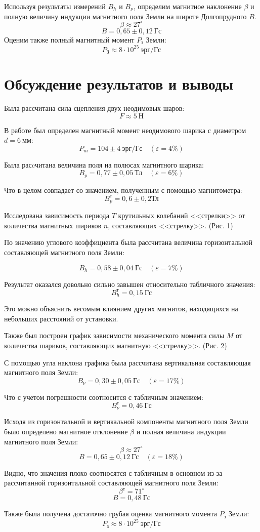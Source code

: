 Используя результаты измерений $B_h$ и $B_\nu$, определим магнитное наклонение $\beta$ и полную
величину индукции магнитного поля Земли на широте Долгопрудного $B$. 
     \[   \beta  \approx 27^\circ  \]
     \[   B = 0,65 \pm 0,12 \ \text{Гс}\]
Оценим также полный магнитный момент $P_\text{з}$ Земли:
\[ P_\text{З} \approx 8\cdot 10^{25}\ \text{эрг}/\text{Гс} \]

\section{Обсуждение результатов и выводы}
Была рассчитана сила сцепления двух неодимовых шаров:
\[ F \approx 5\ \text{Н}\]

В работе был определен магнитный момент неодимового шарика с диаметром $d = 6\ \text{мм}$:
\[P_m = 104 \pm 4\ \text{эрг}/\text{Гс}\quad (\varepsilon = 4\%)\]

Была расcчитана величина поля на полюсах магнитного шарика:
\[ B_p = 0,77 \pm 0,05\ \text{Тл} \quad (\varepsilon = 6\%) \]

Что в целом совпадает со значением, полученным с помощью магнитометра:
\[ B_p^\text{т} = 0,6 \pm 0,2 \text{Тл} \]

Исследована зависимость периода $T$ крутильных колебаний <<стрелки>> от количества магнитных
шариков $n$, составляющих <<стрелку>>. (Рис. 1)

По значению углового коэффициента была рассчитана величина горизонтальной составляющей
магнитного поля Земли:

\[ B_h = 0,58 \pm 0,04\ \text{Гс} \quad (\varepsilon= 7\%)\]

Результат оказался довольно сильно завышен относительно табличного значения:
\[ B_h^\text{т} = 0,15\ \text{Гс} \]

Это можно объяснить весомым влиянием других магнитов, находящихся на небольших расстояний от
установки.

Также был построен график зависимости механического момента силы $M$ от количества шариков,
составляющих магнитную <<стрелку>>. (Рис. 2)

С помощью угла наклона графика была рассчитана вертикальная составляющая магнитного поля
Земли: 
\[ B_\nu = 0,30 \pm 0,05\ \text{Гс} \quad (\varepsilon = 17\%)  \]

Что с учетом погрешности соотносится с табличным значением:
\[ B_\nu^\text{т} = 0,46 \ \text{Гс} \]

Исходя из горизонтальной и вертикальной компоненты магнитного поля Земли было определено
магнитное отклонение $\beta$ и полная величина индукции магнитного поля Земли:
\[ \beta \approx 27^\circ \]
\[ B = 0,65 \pm 0,12\ \text{Гс} \quad (\varepsilon = 18\%) \]

Видно, что значения плохо соотносятся с табличным в основном из-за рассчитанной горизонтальной
составляющей магнитного поля Земли:
\[ \beta^\text{т} = 71^\circ \]
\[ B = 0,48 \ \text{Гс}\]

Также была получена достаточно грубая оценка магнитного момента $P_\text{з}$ Земли:
\[P_\text{з} \approx 8 \cdot 10^{25}\ \text{эрг}/\text{Гс} \]



